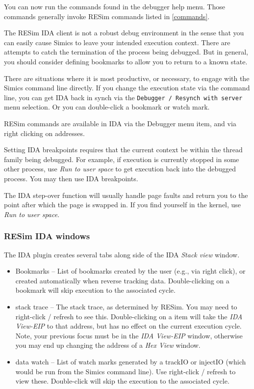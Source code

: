 \documentclass[titlepage]{article}
\begin{document}
You can now run the commands found in the debugger help menu.  Those commands generally invoke RESim commands listed in \ref{commands}.

The RESim IDA client is not a robust debug environment in the sense that you can easily cause Simics to leave your intended execution context.
There are attempts to catch the termination of the process being debugged.  But in general, you should consider defining bookmarks to allow you to
return to a known state.  

There are situations where it is most productive, or necessary, to engage with the Simics command line directly.  If you change the execution state
via the command line, you can get IDA back in synch via the {\tt Debugger / Resynch with server} menu selection.  Or you can double-click a bookmark
or watch mark.

RESim commands are available in IDA via the Debugger menu item, and via right clicking on addresses.  

Setting IDA breakpoints requires that the current context be within the thread family being debugged.  For example, if execution is currently 
stopped in some other process, use \textit{Run to user space} to get execution back into the debugged process.  You may then use IDA breakpoints.

The IDA step-over function will usually handle page faults and return you to the point after which the page is swapped in.  If you find yourself in
the kernel, use \textit{Run to user space}.


\subsubsection{RESim IDA windows}
The IDA plugin creates several tabs along side of the IDA \textit{Stack view} window.  
\begin{itemize}
\item Bookmarks -- List of bookmarks created by the user (e.g., via right click), or created automatically when reverse tracking data.
Double-clicking on a bookmark will skip execution to the associated cycle.
\item stack trace -- The stack trace, as determined by RESim.  You may need to right-click / refresh to see this.  Double-clicking on a item
will take the \textit{IDA View-EIP} to that address, but has no effect on the current execution cycle.  Note, your previous focus must be in
the \textit{IDA View-EIP} window, otherwise you may end up changing the address of a \textit{Hex View} window.
\item data watch -- List of watch marks generated by a trackIO or injectIO (which would be run from the Simics command line).  
Use right-click / refresh to view these.  Double-click will skip the execution to the associated cycle.
\end{itemize}
\end{document}
